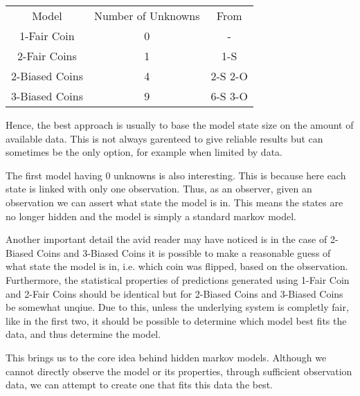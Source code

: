 \begin{center}
	\begin{tabular}{c c c}
		Model  & Number of Unknowns & From\\
		1-Fair Coin    & 0 & - \\
		2-Fair Coins   & 1 & 1-S\\ 
		2-Biased Coins & 4 & 2-S 2-O\\
		3-Biased Coins & 9 & 6-S 3-O
	\end{tabular}
\end{center}

Hence, the best approach is usually to base the model state size on the amount of available data. This is not always garenteed to give reliable results but can sometimes be the only option, for example when limited by data.

The first model having 0 unknowns is also interesting. This is because here each state is linked with only one observation. Thus, as an observer, given an observation we can assert what state the model is in. This means the states are no longer hidden and the model is simply a standard markov model. 

Another important detail the avid reader may have noticed is in the case of 2-Biased Coins and 3-Biased Coins it is possible to make a reasonable guess of what state the model is in, i.e. which coin was flipped, based on the observation. Furthermore, the statistical properties of predictions generated using 1-Fair Coin and 2-Fair Coins should be identical but for 2-Biased Coins and 3-Biased Coins be somewhat unqiue. Due to this, unless the underlying system is completly fair, like in the first two, it should be possible to determine which model best fits the data, and thus determine the model.


This brings us to the core idea behind hidden markov models. Although we cannot directly observe the model or its properties, through sufficient observation data, we can attempt to create one that fits this data the best. 
